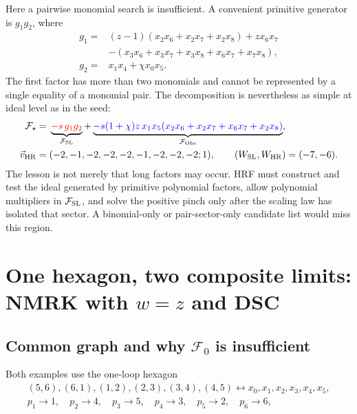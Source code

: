 \documentclass[a4paper,11pt]{article}
\newcommand{\FSL}{\mathcal F_{\rm SL}}
\newcommand{\FObs}{\mathcal F_{\rm Obs}}
\newcommand{\WSL}{W_{\rm SL}}
\newcommand{\WHR}{W_{\rm HR}}
\newcommand{\vHR}{\vec v_{\rm HR}}
\newcommand{\SLcolour}[1]{{\color{red}#1}}
\newcommand{\HRcolour}[1]{{\color{blue}#1}}
\begin{document}
Here a pairwise monomial search is insufficient.  A convenient primitive
generator is \(g_1g_2\), where
\begin{align}
 g_1={}&(z-1)(x_2x_6+x_2x_7+x_2x_8)+zx_6x_7
 \nonumber\\[-1mm]
 &-(x_3x_6+x_3x_7+x_3x_8+x_6x_7+x_7x_8),
 \nonumber\\
 g_2={}&x_1x_4+\chi x_0x_5.
 \label{eq:five-vertex-factors}
\end{align}
The first factor has more than two monomials and cannot be represented by a
single equality of a monomial pair.  The decomposition is nevertheless as
simple at ideal level as in the seed:
\begin{align}
 \mathcal F_\star={}&
 \underbrace{\SLcolour{-s\,g_1g_2}}_{\FSL}
 +\underbrace{\HRcolour{-s(1+\chi)z\,x_1x_5
 (x_2x_6+x_2x_7+x_6x_7+x_2x_8)}}_{\FObs},
 \label{eq:five-vertex-decomposition}\\
 \vHR={}&(-2,-1,-2,-2,-2,-1,-2,-2,-2;1),
 \qquad (\WSL,\WHR)=(-7,-6).
 \label{eq:five-vertex-vector}
\end{align}
The lesson is not merely that long factors may occur.  HRF must construct
and test the ideal generated by primitive polynomial factors, allow
polynomial multipliers in \(\FSL\), and solve the positive pinch only after
the scaling law has isolated that sector.  A binomial-only or
pair-sector-only candidate list would miss this region.

\section{One hexagon, two composite limits: NMRK with \texorpdfstring{\(w=z\)}{w=z} and DSC}
\label{sec:example-alignment}

\subsection{Common graph and why \texorpdfstring{\(\mathcal F_0\)}{F0} is insufficient}

Both examples use the one-loop hexagon
\begin{equation}
 \begin{gathered}
 (5,6),(6,1),(1,2),(2,3),(3,4),(4,5)
 \longleftrightarrow x_0,x_1,x_2,x_3,x_4,x_5,\\
 p_1\to1,\quad p_2\to4,\quad p_3\to5,\quad
 p_4\to3,\quad p_5\to2,\quad p_6\to6,
 \end{gathered}
 \label{eq:hexagon-edge-map}
\end{equation}
\end{document}
